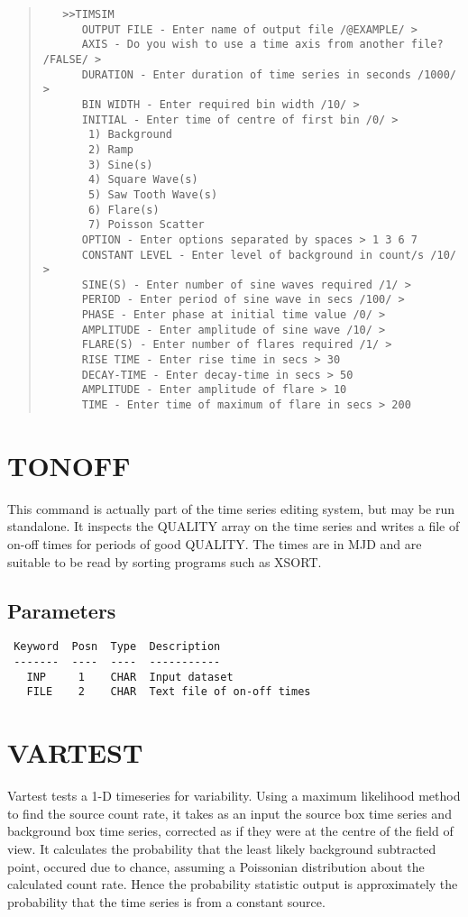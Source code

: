 \documentclass{book}
\renewcommand{\_}{{\tt\char'137}}     %
\begin{document}
\begin{quote}\begin{verbatim}
   >>TIMSIM
      OUTPUT FILE - Enter name of output file /@EXAMPLE/ >
      AXIS - Do you wish to use a time axis from another file? /FALSE/ >
      DURATION - Enter duration of time series in seconds /1000/ >
      BIN WIDTH - Enter required bin width /10/ >
      INITIAL - Enter time of centre of first bin /0/ >
       1) Background
       2) Ramp
       3) Sine(s)
       4) Square Wave(s)
       5) Saw Tooth Wave(s)
       6) Flare(s)
       7) Poisson Scatter
      OPTION - Enter options separated by spaces > 1 3 6 7
      CONSTANT LEVEL - Enter level of background in count/s /10/ >
      SINE(S) - Enter number of sine waves required /1/ >
      PERIOD - Enter period of sine wave in secs /100/ >
      PHASE - Enter phase at initial time value /0/ >
      AMPLITUDE - Enter amplitude of sine wave /10/ >
      FLARE(S) - Enter number of flares required /1/ >
      RISE TIME - Enter rise time in secs > 30
      DECAY-TIME - Enter decay-time in secs > 50
      AMPLITUDE - Enter amplitude of flare > 10
      TIME - Enter time of maximum of flare in secs > 200
\end{verbatim}\end{quote}
\section{TONOFF}
This command is actually part of the time series editing system,
but may be run standalone. It inspects the QUALITY array on the
time series and writes a file of on-off times for periods of
good QUALITY. The times are in MJD and are suitable to be read
by sorting programs such as XSORT.

\subsection{Parameters}
\begin{verbatim}
 Keyword  Posn  Type  Description
 -------  ----  ----  -----------
   INP     1    CHAR  Input dataset
   FILE    2    CHAR  Text file of on-off times

\end{verbatim}\section{VARTEST}
Vartest tests a 1-D timeseries for variability. Using a maximum
likelihood method to find the source count rate, it takes as an
input the source box time series and background box time series,
corrected as if they were at the centre of the field of view. It
calculates the probability that the least likely background
subtracted point, occured due to chance, assuming a Poissonian
distribution about the calculated count rate. Hence the
probability statistic output is approximately the probability
that the time series is from a constant source.
\end{document}

